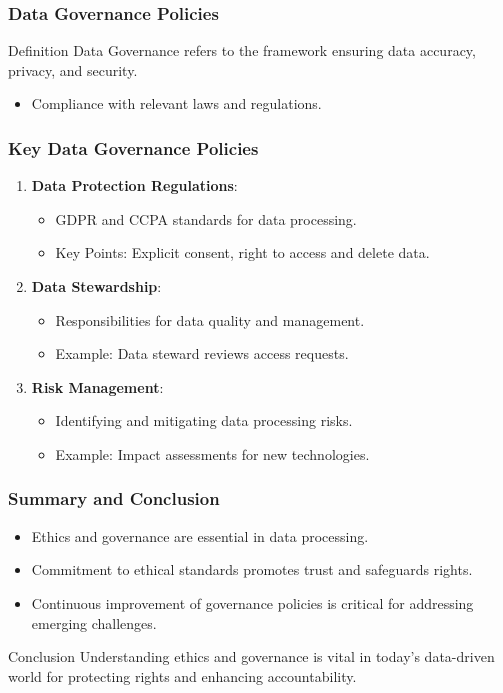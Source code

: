 \documentclass{beamer}
\begin{document}
\begin{frame}[fragile]
    \frametitle{Data Governance Policies}
    \begin{block}{Definition}
        Data Governance refers to the framework ensuring data accuracy, privacy, and security.
    \end{block}
    
    \begin{itemize}
        \item Compliance with relevant laws and regulations.
    \end{itemize}
\end{frame}

\begin{frame}[fragile]
    \frametitle{Key Data Governance Policies}
    \begin{enumerate}
        \item \textbf{Data Protection Regulations}:
            \begin{itemize}
                \item GDPR and CCPA standards for data processing.
                \item Key Points: Explicit consent, right to access and delete data.
            \end{itemize}
        \item \textbf{Data Stewardship}:
            \begin{itemize}
                \item Responsibilities for data quality and management.
                \item Example: Data steward reviews access requests.
            \end{itemize}
        \item \textbf{Risk Management}:
            \begin{itemize}
                \item Identifying and mitigating data processing risks.
                \item Example: Impact assessments for new technologies.
            \end{itemize}
    \end{enumerate}
\end{frame}

\begin{frame}[fragile]
    \frametitle{Summary and Conclusion}
    \begin{itemize}
        \item Ethics and governance are essential in data processing.
        \item Commitment to ethical standards promotes trust and safeguards rights.
        \item Continuous improvement of governance policies is critical for addressing emerging challenges.
    \end{itemize}
    
    \begin{block}{Conclusion}
        Understanding ethics and governance is vital in today’s data-driven world for protecting rights and enhancing accountability.
    \end{block}
\end{frame}
\end{document}
